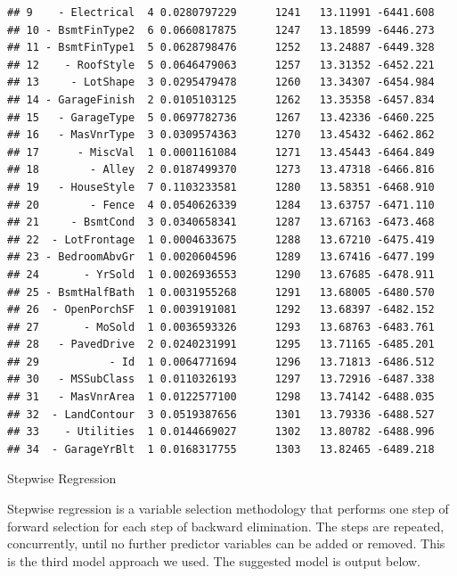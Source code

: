 \documentclass[american,]{article}
\theoremstyle{definition}
\theoremstyle{definition}
\theoremstyle{definition}
\theoremstyle{remark}
\begin{document}
\begin{verbatim}
## 9    - Electrical  4 0.0280797229      1241   13.11991 -6441.608
## 10 - BsmtFinType2  6 0.0660817875      1247   13.18599 -6446.273
## 11 - BsmtFinType1  5 0.0628798476      1252   13.24887 -6449.328
## 12    - RoofStyle  5 0.0646479063      1257   13.31352 -6452.221
## 13     - LotShape  3 0.0295479478      1260   13.34307 -6454.984
## 14 - GarageFinish  2 0.0105103125      1262   13.35358 -6457.834
## 15   - GarageType  5 0.0697782736      1267   13.42336 -6460.225
## 16   - MasVnrType  3 0.0309574363      1270   13.45432 -6462.862
## 17      - MiscVal  1 0.0001161084      1271   13.45443 -6464.849
## 18        - Alley  2 0.0187499370      1273   13.47318 -6466.816
## 19   - HouseStyle  7 0.1103233581      1280   13.58351 -6468.910
## 20        - Fence  4 0.0540626339      1284   13.63757 -6471.110
## 21     - BsmtCond  3 0.0340658341      1287   13.67163 -6473.468
## 22  - LotFrontage  1 0.0004633675      1288   13.67210 -6475.419
## 23 - BedroomAbvGr  1 0.0020604596      1289   13.67416 -6477.199
## 24       - YrSold  1 0.0026936553      1290   13.67685 -6478.911
## 25 - BsmtHalfBath  1 0.0031955268      1291   13.68005 -6480.570
## 26  - OpenPorchSF  1 0.0039191081      1292   13.68397 -6482.152
## 27       - MoSold  1 0.0036593326      1293   13.68763 -6483.761
## 28   - PavedDrive  2 0.0240231991      1295   13.71165 -6485.201
## 29           - Id  1 0.0064771694      1296   13.71813 -6486.512
## 30   - MSSubClass  1 0.0110326193      1297   13.72916 -6487.338
## 31   - MasVnrArea  1 0.0122577100      1298   13.74142 -6488.035
## 32  - LandContour  3 0.0519387656      1301   13.79336 -6488.527
## 33    - Utilities  1 0.0144669027      1302   13.80782 -6488.996
## 34  - GarageYrBlt  1 0.0168317755      1303   13.82465 -6489.218
\end{verbatim}

Stepwise Regression

Stepwise regression is a variable selection methodology that performs
one step of forward selection for each step of backward elimination. The
steps are repeated, concurrently, until no further predictor variables
can be added or removed. This is the third model approach we used. The
suggested model is output below.
\end{document}
